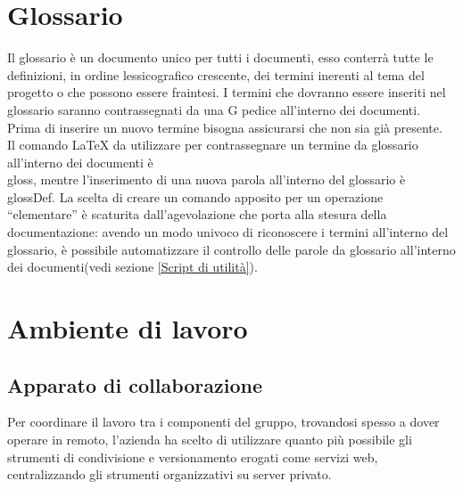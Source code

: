 \documentclass{scalatekids-article}
\begin{document}
\section{Glossario}
Il glossario è un documento unico per tutti i documenti, esso conterrà tutte le
definizioni, in ordine lessicografico crescente, dei termini inerenti al tema
del progetto o che possono essere fraintesi. I termini che dovranno essere
inseriti nel glossario saranno contrassegnati da una G pedice all'interno dei
documenti. Prima di inserire un nuovo termine bisogna assicurarsi che non sia
già presente.\\ Il comando \LaTeX\xspace da utilizzare per contrassegnare un
termine da glossario all'interno dei documenti è \\gloss, mentre l'inserimento
di una nuova parola all'interno del glossario è \\glossDef. La scelta di creare
un comando apposito per un operazione ``elementare'' è scaturita
dall'agevolazione che porta alla stesura della documentazione: avendo un modo
univoco di riconoscere i termini all'interno del glossario, è possibile
automatizzare il controllo delle parole da glossario all'interno dei
documenti(vedi sezione \ref{Script di utilità}).

\section{Ambiente di lavoro}
\subsection{Apparato di collaborazione}
Per coordinare il lavoro tra i componenti del gruppo, trovandosi spesso a dover
operare in remoto, l'azienda ha scelto di utilizzare quanto più possibile gli
strumenti di condivisione e versionamento erogati come servizi web,
centralizzando gli strumenti organizzativi su server privato.
\end{document}

